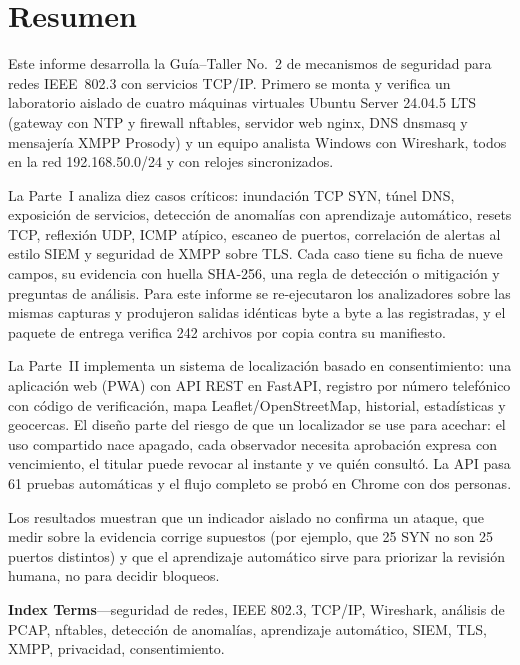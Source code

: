 \chapter*{Resumen}
\thispagestyle{plain}
Este informe desarrolla la Guía–Taller No.~2 de mecanismos de seguridad para redes IEEE~802.3 con servicios TCP/IP. Primero se monta y verifica un laboratorio aislado de cuatro máquinas virtuales Ubuntu Server 24.04.5 LTS (gateway con NTP y firewall nftables, servidor web nginx, DNS dnsmasq y mensajería XMPP Prosody) y un equipo analista Windows con Wireshark, todos en la red 192.168.50.0/24 y con relojes sincronizados.

La Parte~I analiza diez casos críticos: inundación TCP SYN, túnel DNS, exposición de servicios, detección de anomalías con aprendizaje automático, resets TCP, reflexión UDP, ICMP atípico, escaneo de puertos, correlación de alertas al estilo SIEM y seguridad de XMPP sobre TLS. Cada caso tiene su ficha de nueve campos, su evidencia con huella SHA-256, una regla de detección o mitigación y preguntas de análisis. Para este informe se re-ejecutaron los analizadores sobre las mismas capturas y produjeron salidas idénticas byte a byte a las registradas, y el paquete de entrega verifica 242 archivos por copia contra su manifiesto.

La Parte~II implementa un sistema de localización basado en consentimiento: una aplicación web (PWA) con API REST en FastAPI, registro por número telefónico con código de verificación, mapa Leaflet/OpenStreetMap, historial, estadísticas y geocercas. El diseño parte del riesgo de que un localizador se use para acechar: el uso compartido nace apagado, cada observador necesita aprobación expresa con vencimiento, el titular puede revocar al instante y ve quién consultó. La API pasa 61 pruebas automáticas y el flujo completo se probó en Chrome con dos personas.

Los resultados muestran que un indicador aislado no confirma un ataque, que medir sobre la evidencia corrige supuestos (por ejemplo, que 25 SYN no son 25 puertos distintos) y que el aprendizaje automático sirve para priorizar la revisión humana, no para decidir bloqueos.

\vspace{0.6cm}
\noindent\textbf{Index Terms}---seguridad de redes, IEEE 802.3, TCP/IP, Wireshark, análisis de PCAP, nftables, detección de anomalías, aprendizaje automático, SIEM, TLS, XMPP, privacidad, consentimiento.
